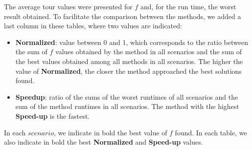 \documentclass[preprint,authoryear]{elsarticle}
\begin{document}
The average tour values were presented for $f$ and, for the run time, the worst result obtained. To facilitate the comparison between the methods, we added a last column in these tables, where two values are indicated:
\begin{itemize}
	\item {\bf Normalized}: value between 0 and 1, which corresponds to the ratio between the sum of $f$\/ values obtained by the method in all scenarios and the sum of the best values obtained among all methods in all scenarios. The higher the value of {\bf Normalized}, the closer the method approached the best solutions found.
	\item {\bf Speedup}: ratio of the sums of the worst runtimes of all scenarios and the sum of the method runtimes in all scenarios. The method with the highest {\bf Speed-up}\/ is the fastest.
\end{itemize}

In each $scenario$, we indicate in bold the best value of $f$\/ found. In each table, we also indicate in bold the best {\bf Normalized}\/ and {\bf Speed-up}\/ values.


\vspace{2.0mm}
\end{document}
